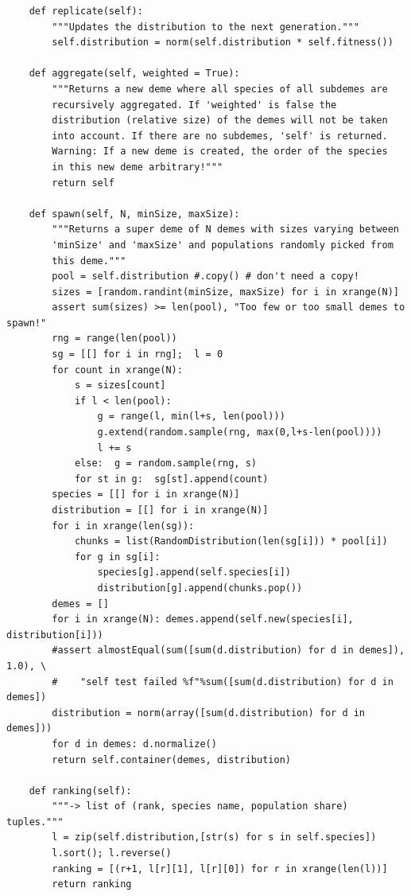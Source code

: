 \begin{scriptsize}
\begin{verbatim}
    def replicate(self):
        """Updates the distribution to the next generation."""
        self.distribution = norm(self.distribution * self.fitness())

    def aggregate(self, weighted = True):
        """Returns a new deme where all species of all subdemes are
        recursively aggregated. If 'weighted' is false the
        distribution (relative size) of the demes will not be taken
        into account. If there are no subdemes, 'self' is returned.
        Warning: If a new deme is created, the order of the species 
        in this new deme arbitrary!"""
        return self

    def spawn(self, N, minSize, maxSize):
        """Returns a super deme of N demes with sizes varying between
        'minSize' and 'maxSize' and populations randomly picked from
        this deme."""
        pool = self.distribution #.copy() # don't need a copy!
        sizes = [random.randint(minSize, maxSize) for i in xrange(N)]
        assert sum(sizes) >= len(pool), "Too few or too small demes to spawn!"
        rng = range(len(pool))
        sg = [[] for i in rng];  l = 0
        for count in xrange(N):
            s = sizes[count]
            if l < len(pool):
                g = range(l, min(l+s, len(pool)))
                g.extend(random.sample(rng, max(0,l+s-len(pool))))
                l += s
            else:  g = random.sample(rng, s)
            for st in g:  sg[st].append(count)
        species = [[] for i in xrange(N)]
        distribution = [[] for i in xrange(N)]
        for i in xrange(len(sg)):
            chunks = list(RandomDistribution(len(sg[i])) * pool[i])
            for g in sg[i]:
                species[g].append(self.species[i])
                distribution[g].append(chunks.pop())
        demes = []
        for i in xrange(N): demes.append(self.new(species[i], distribution[i]))
        #assert almostEqual(sum([sum(d.distribution) for d in demes]), 1.0), \
        #    "self test failed %f"%sum([sum(d.distribution) for d in demes])
        distribution = norm(array([sum(d.distribution) for d in demes]))
        for d in demes: d.normalize()
        return self.container(demes, distribution)

    def ranking(self):
        """-> list of (rank, species name, population share) tuples."""
        l = zip(self.distribution,[str(s) for s in self.species])
        l.sort(); l.reverse()
        ranking = [(r+1, l[r][1], l[r][0]) for r in xrange(len(l))]
        return ranking
\end{verbatim}
\end{scriptsize}

